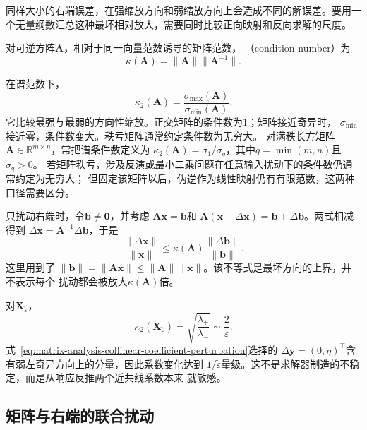 同样大小的右端误差，在强缩放方向和弱缩放方向上会造成不同的解误差。要用一个无量纲数汇总这种最坏相对放大，需要同时比较正向映射和反向求解的尺度。

\begin{definition}[可逆矩阵的条件数]
\label{def:matrix-analysis-condition-number}
对可逆方阵$\bm{A}$，相对于同一向量范数诱导的矩阵范数，
（condition number）为
\begin{equation}
  \kappa(\bm{A})
  =\lVert\bm{A}\rVert\lVert\bm{A}^{-1}\rVert.
  \label{eq:matrix-analysis-condition-number}
\end{equation}
\end{definition}
在谱范数下，
\begin{equation}
  \kappa_2(\bm{A})
  =\frac{\sigma_{\max}(\bm{A})}{\sigma_{\min}(\bm{A})}.
  \label{eq:matrix-analysis-spectral-condition-number}
\end{equation}
它比较最强与最弱的方向性缩放。正交矩阵的条件数为$1$；矩阵接近奇异时，
$\sigma_{\min}$接近零，条件数变大。秩亏矩阵通常约定条件数为无穷大。
对满秩长方矩阵$\bm{A}\in\mathbb{R}^{m\times n}$，常把谱条件数定义为
$\kappa_2(\bm{A})=\sigma_1/\sigma_q$，其中$q=\min(m,n)$且$\sigma_q>0$。
若矩阵秩亏，涉及反演或最小二乘问题在任意输入扰动下的条件数仍通常约定为无穷大；
但固定该矩阵以后，伪逆作为线性映射仍有有限范数，这两种口径需要区分。

只扰动右端时，令$\bm{b}\neq\bm{0}$，并考虑
$\bm{A}\bm{x}=\bm{b}$和
$\bm{A}(\bm{x}+\Delta\bm{x})=\bm{b}+\Delta\bm{b}$。两式相减得到
$\Delta\bm{x}=\bm{A}^{-1}\Delta\bm{b}$，于是
\[
  \frac{\lVert\Delta\bm{x}\rVert}
       {\lVert\bm{x}\rVert}
  \leq
  \kappa(\bm{A})
  \frac{\lVert\Delta\bm{b}\rVert}
       {\lVert\bm{b}\rVert}.
\]
这里用到了
$\lVert\bm{b}\rVert=\lVert\bm{A}\bm{x}\rVert
\leq\lVert\bm{A}\rVert\lVert\bm{x}\rVert$。该不等式是最坏方向的上界，并不表示每个
扰动都会被放大$\kappa(\bm{A})$倍。

对$\bm{X}_{\widetilde{\varepsilon}}$，
\[
  \kappa_2(\bm{X}_{\widetilde{\varepsilon}})
  =\sqrt{\frac{\lambda_+}{\lambda_-}}
  \sim\frac{2}{\widetilde{\varepsilon}}.
\]
式~\eqref{eq:matrix-analysis-collinear-coefficient-perturbation}选择的
$\Delta\bm{y}=(0,\eta)^{\top}$含有弱左奇异方向上的分量，因此系数变化达到
$1/\widetilde{\varepsilon}$量级。这不是求解器制造的不稳定，而是从响应反推两个近共线系数本来
就敏感。

\subsection{矩阵与右端的联合扰动}


